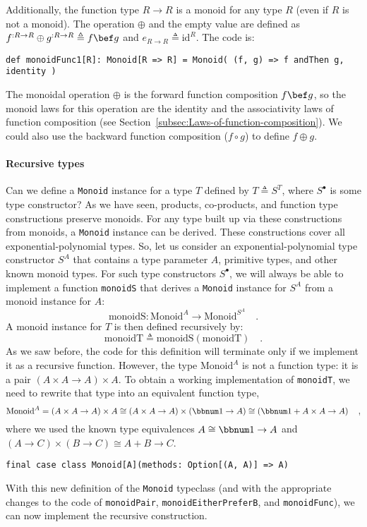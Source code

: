 Additionally, the function type $R\rightarrow R$ is a monoid for
any type $R$ (even if $R$ is not a monoid). The operation $\oplus$
and the empty value are defined as $f^{:R\rightarrow R}\oplus g^{:R\rightarrow R}\triangleq f\bef g$
and $e_{R\rightarrow R}\triangleq\text{id}^{R}$. The code is:
\begin{lstlisting}
def monoidFunc1[R]: Monoid[R => R] = Monoid( (f, g) => f andThen g, identity )
\end{lstlisting}
The monoidal operation $\oplus$ is the forward function composition
$f\bef g$, so the monoid laws for this operation are the identity
and the associativity laws of function composition (see Section~\ref{subsec:Laws-of-function-composition}).
We could also use the backward function composition ($f\circ g$)
to define $f\oplus g$.

\paragraph{Recursive types}

Can we define a \lstinline!Monoid! instance for a type $T$ defined
by $T\triangleq S^{T}$, where $S^{\bullet}$ is some type constructor?
As we have seen, products, co-products, and function type constructions
preserve monoids. For any type built up via these constructions from
monoids, a \lstinline!Monoid! instance can be derived. These constructions
cover all exponential-polynomial types. So, let us consider an exponential-polynomial
type constructor $S^{A}$ that contains a type parameter $A$, primitive
types, and other known monoid types. For such type constructors $S^{\bullet}$,
we will always be able to implement a function \lstinline!monoidS!
that derives a \lstinline!Monoid! instance for $S^{A}$ from a monoid
instance for $A$:
\[
\text{monoidS}:\text{Monoid}^{A}\rightarrow\text{Monoid}^{S^{A}}\quad.
\]
A monoid instance for $T$ is then defined recursively by:
\[
\text{monoidT}\triangleq\text{monoidS}\left(\text{monoidT}\right)\quad.
\]
As we saw before, the code for this definition will terminate only
if we implement it as a recursive function. However, the type $\text{Monoid}^{A}$
is not a function type: it is a pair $\left(A\times A\rightarrow A\right)\times A$.
To obtain a working implementation of \lstinline!monoidT!, we need
to rewrite that type into an equivalent function type,
\[
\text{Monoid}^{A}=\left(A\times A\rightarrow A\right)\times A\cong\left(A\times A\rightarrow A\right)\times\left(\bbnum 1\rightarrow A\right)\cong\left(\bbnum 1+A\times A\rightarrow A\right)\quad,
\]
where we used the known type equivalences $A\cong\bbnum 1\rightarrow A$
and $\left(A\rightarrow C\right)\times\left(B\rightarrow C\right)\cong A+B\rightarrow C$.
\begin{lstlisting}
final case class Monoid[A](methods: Option[(A, A)] => A)
\end{lstlisting}
With this new definition of the \lstinline!Monoid! typeclass (and
with the appropriate changes to the code of \lstinline!monoidPair!,
\lstinline!monoidEitherPreferB!, and \lstinline!monoidFunc!), we
can now implement the recursive construction.

